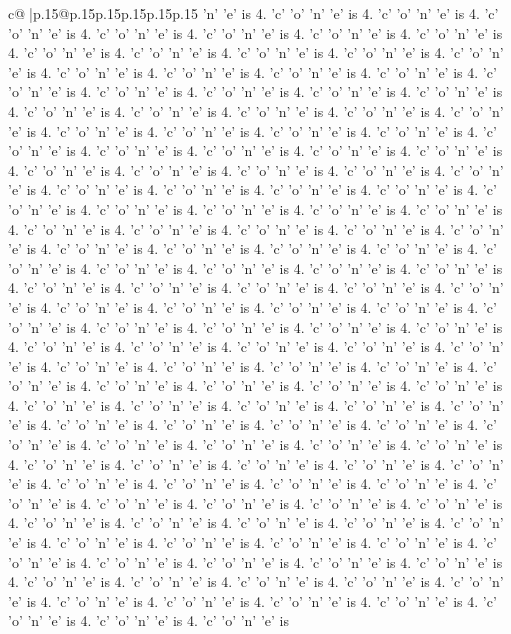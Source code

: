 \documentclass{article}
\begin{document}
{\begin{supertabular}{c@{$\;$}|p{.15\linewidth}@{}p{.15\linewidth}p{.15\linewidth}p{.15\linewidth}p{.15\linewidth}p{.15\linewidth}}
{{{'n' 'e' is 4. 'c' 'o' 'n' 'e' is 4. 'c' 'o' 'n' 'e' is 4. 'c' 'o' 'n' 'e' is 4. 'c' 'o' 'n' 'e' is 4. 'c' 'o' 'n' 'e' is 4. 'c' 'o' 'n' 'e' is 4. 'c' 'o' 'n' 'e' is 4. 'c' 'o' 'n' 'e' is 4. 'c' 'o' 'n' 'e' is 4. 'c' 'o' 'n' 'e' is 4. 'c' 'o' 'n' 'e' is 4. 'c' 'o' 'n' 'e' is 4. 'c' 'o' 'n' 'e' is 4. 'c' 'o' 'n' 'e' is 4. 'c' 'o' 'n' 'e' is 4. 'c' 'o' 'n' 'e' is 4. 'c' 'o' 'n' 'e' is 4. 'c' 'o' 'n' 'e' is 4. 'c' 'o' 'n' 'e' is 4. 'c' 'o' 'n' 'e' is 4. 'c' 'o' 'n' 'e' is 4. 'c' 'o' 'n' 'e' is 4. 'c' 'o' 'n' 'e' is 4. 'c' 'o' 'n' 'e' is 4. 'c' 'o' 'n' 'e' is 4. 'c' 'o' 'n' 'e' is 4. 'c' 'o' 'n' 'e' is 4. 'c' 'o' 'n' 'e' is 4. 'c' 'o' 'n' 'e' is 4. 'c' 'o' 'n' 'e' is 4. 'c' 'o' 'n' 'e' is 4. 'c' 'o' 'n' 'e' is 4. 'c' 'o' 'n' 'e' is 4. 'c' 'o' 'n' 'e' is 4. 'c' 'o' 'n' 'e' is 4. 'c' 'o' 'n' 'e' is 4. 'c' 'o' 'n' 'e' is 4. 'c' 'o' 'n' 'e' is 4. 'c' 'o' 'n' 'e' is 4. 'c' 'o' 'n' 'e' is 4. 'c' 'o' 'n' 'e' is 4. 'c' 'o' 'n' 'e' is 4. 'c' 'o' 'n' 'e' is 4. 'c' 'o' 'n' 'e' is 4. 'c' 'o' 'n' 'e' is 4. 'c' 'o' 'n' 'e' is 4. 'c' 'o' 'n' 'e' is 4. 'c' 'o' 'n' 'e' is 4. 'c' 'o' 'n' 'e' is 4. 'c' 'o' 'n' 'e' is 4. 'c' 'o' 'n' 'e' is 4. 'c' 'o' 'n' 'e' is 4. 'c' 'o' 'n' 'e' is 4. 'c' 'o' 'n' 'e' is 4. 'c' 'o' 'n' 'e' is 4. 'c' 'o' 'n' 'e' is 4. 'c' 'o' 'n' 'e' is 4. 'c' 'o' 'n' 'e' is 4. 'c' 'o' 'n' 'e' is 4. 'c' 'o' 'n' 'e' is 4. 'c' 'o' 'n' 'e' is 4. 'c' 'o' 'n' 'e' is 4. 'c' 'o' 'n' 'e' is 4. 'c' 'o' 'n' 'e' is 4. 'c' 'o' 'n' 'e' is 4. 'c' 'o' 'n' 'e' is 4. 'c' 'o' 'n' 'e' is 4. 'c' 'o' 'n' 'e' is 4. 'c' 'o' 'n' 'e' is 4. 'c' 'o' 'n' 'e' is 4. 'c' 'o' 'n' 'e' is 4. 'c' 'o' 'n' 'e' is 4. 'c' 'o' 'n' 'e' is 4. 'c' 'o' 'n' 'e' is 4. 'c' 'o' 'n' 'e' is 4. 'c' 'o' 'n' 'e' is 4. 'c' 'o' 'n' 'e' is 4. 'c' 'o' 'n' 'e' is 4. 'c' 'o' 'n' 'e' is 4. 'c' 'o' 'n' 'e' is 4. 'c' 'o' 'n' 'e' is 4. 'c' 'o' 'n' 'e' is 4. 'c' 'o' 'n' 'e' is 4. 'c' 'o' 'n' 'e' is 4. 'c' 'o' 'n' 'e' is 4. 'c' 'o' 'n' 'e' is 4. 'c' 'o' 'n' 'e' is 4. 'c' 'o' 'n' 'e' is 4. 'c' 'o' 'n' 'e' is 4. 'c' 'o' 'n' 'e' is 4. 'c' 'o' 'n' 'e' is 4. 'c' 'o' 'n' 'e' is 4. 'c' 'o' 'n' 'e' is 4. 'c' 'o' 'n' 'e' is 4. 'c' 'o' 'n' 'e' is 4. 'c' 'o' 'n' 'e' is 4. 'c' 'o' 'n' 'e' is 4. 'c' 'o' 'n' 'e' is 4. 'c' 'o' 'n' 'e' is 4. 'c' 'o' 'n' 'e' is 4. 'c' 'o' 'n' 'e' is 4. 'c' 'o' 'n' 'e' is 4. 'c' 'o' 'n' 'e' is 4. 'c' 'o' 'n' 'e' is 4. 'c' 'o' 'n' 'e' is 4. 'c' 'o' 'n' 'e' is 4. 'c' 'o' 'n' 'e' is 4. 'c' 'o' 'n' 'e' is 4. 'c' 'o' 'n' 'e' is 4. 'c' 'o' 'n' 'e' is 4. 'c' 'o' 'n' 'e' is 4. 'c' 'o' 'n' 'e' is 4. 'c' 'o' 'n' 'e' is 4. 'c' 'o' 'n' 'e' is 4. 'c' 'o' 'n' 'e' is 4. 'c' 'o' 'n' 'e' is 4. 'c' 'o' 'n' 'e' is 4. 'c' 'o' 'n' 'e' is 4. 'c' 'o' 'n' 'e' is 4. 'c' 'o' 'n' 'e' is 4. 'c' 'o' 'n' 'e' is 4. 'c' 'o' 'n' 'e' is 4. 'c' 'o' 'n' 'e' is 4. 'c' 'o' 'n' 'e' is 4. 'c' 'o' 'n' 'e' is 4. 'c' 'o' 'n' 'e' is 4. 'c' 'o' 'n' 'e' is 4. 'c' 'o' 'n' 'e' is 4. 'c' 'o' 'n' 'e' is 4. 'c' 'o' 'n' 'e' is 4. 'c' 'o' 'n' 'e' is 4. 'c' 'o' 'n' 'e' is 4. 'c' 'o' 'n' 'e' is 4. 'c' 'o' 'n' 'e' is 4. 'c' 'o' 'n' 'e' is 4. 'c' 'o' 'n' 'e' is 4. 'c' 'o' 'n' 'e' is 4. 'c' 'o' 'n' 'e' is 4. 'c' 'o' 'n' 'e' is 4. 'c' 'o' 'n' 'e' is 4. 'c' 'o' 'n' 'e' is 4. 'c' 'o' 'n' 'e' is 4. 'c' 'o' 'n' 'e' is 4. 'c' 'o' 'n' 'e' is 4. 'c' 'o' 'n' 'e' is }}}
\end{supertabular}}
\end{document}
